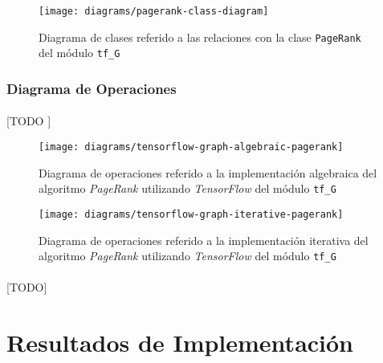 \documentclass{subfiles}
\begin{document}
          \begin{figure}[h]
            \centering
            \texttt{[image: diagrams/pagerank-class-diagram]}
            \caption{Diagrama de clases referido a las relaciones con la clase \texttt{PageRank} del módulo \texttt{tf\_G}}
            \label{img:pagerank_diagram}
          \end{figure}

        \subsubsection{Diagrama de Operaciones}
        \label{sec:operations_diagram}

          \paragraph{}
          [TODO ]

          \begin{figure}[h]
            \centering
            \texttt{[image: diagrams/tensorflow-graph-algebraic-pagerank]}
            \caption{Diagrama de operaciones referido a la implementación algebraica del algoritmo \emph{PageRank} utilizando \emph{TensorFlow} del módulo \texttt{tf\_G}}
            \label{img:pagerank_algebraic_diagram}
          \end{figure}

          \begin{figure}[h]
            \centering
            \texttt{[image: diagrams/tensorflow-graph-iterative-pagerank]}
            \caption{Diagrama de operaciones referido a la implementación iterativa del algoritmo \emph{PageRank} utilizando \emph{TensorFlow} del módulo \texttt{tf\_G}}
            \label{img:pagerank_iterative_diagram}
          \end{figure}

      \paragraph{}
      [TODO]

    \section{Resultados de Implementación}
    \label{sec:implementation_results}
\end{document}
